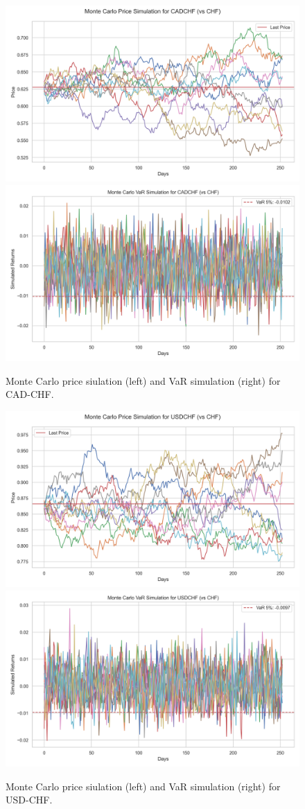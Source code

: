 \documentclass{article}
\begin{document}
\begin{figure}[H]
    \centering  \includegraphics[width=0.48\linewidth]{reports/figures/monte_carlo_price_simulation_CADCHF_vs_CHF.png} \label{fig:monte_carlo_price_simulation_CADCHF_vs_CHF}
    \includegraphics[width=0.48\linewidth]{reports/figures/monte_carlo_var_simulation_CADCHF_vs_CHF.png} \label{fig:monte_carlo_var_simulation_CADCHF_vs_CHF}
    \caption{\footnotesize Monte Carlo price siulation (left) and VaR simulation (right) for CAD-CHF.}
\end{figure}

\begin{figure}[H]
    \centering  \includegraphics[width=0.48\linewidth]{reports/figures/monte_carlo_price_simulation_USDCHF_vs_CHF.png} \label{fig:monte_carlo_price_simulation_USDCHF_vs_CHF}
    \includegraphics[width=0.48\linewidth]{reports/figures/monte_carlo_var_simulation_USDCHF_vs_CHF.png} \label{fig:monte_carlo_var_simulation_USDCHF_vs_CHF}
    \caption{\footnotesize Monte Carlo price siulation (left) and VaR simulation (right) for USD-CHF.}
\end{figure}
\end{document}
